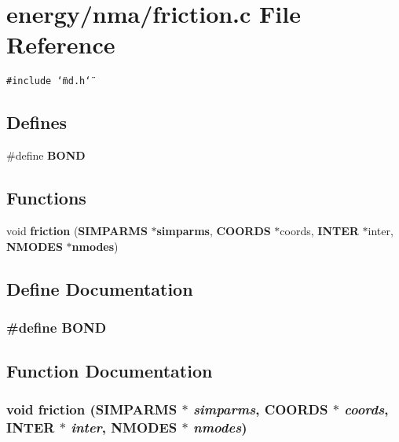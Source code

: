 \section{energy/nma/friction.c File Reference}
\label{friction_8c}
{\tt \#include \char`\"{}md.h\char`\"{}}\par
\subsection*{Defines}
\begin{CompactItemize}
\item 
\#define {\bf BOND}
\end{CompactItemize}
\subsection*{Functions}
\begin{CompactItemize}
\item 
void {\bf friction} ({\bf SIMPARMS} $\ast${\bf simparms}, {\bf COORDS} $\ast$coords, {\bf INTER} $\ast$inter, {\bf NMODES} $\ast${\bf nmodes})
\end{CompactItemize}


\subsection{Define Documentation}
\subsubsection{\setlength{\rightskip}{0pt plus 5cm}\#define BOND}\label{friction_8c_5e2223d9feeb25ebee8545107a8facd8}




\subsection{Function Documentation}
\subsubsection{\setlength{\rightskip}{0pt plus 5cm}void friction ({\bf SIMPARMS} $\ast$ {\em simparms}, {\bf COORDS} $\ast$ {\em coords}, {\bf INTER} $\ast$ {\em inter}, {\bf NMODES} $\ast$ {\em nmodes})}\label{friction_8c_59e9d2f3f6a82844918ddfd0ad436747}


